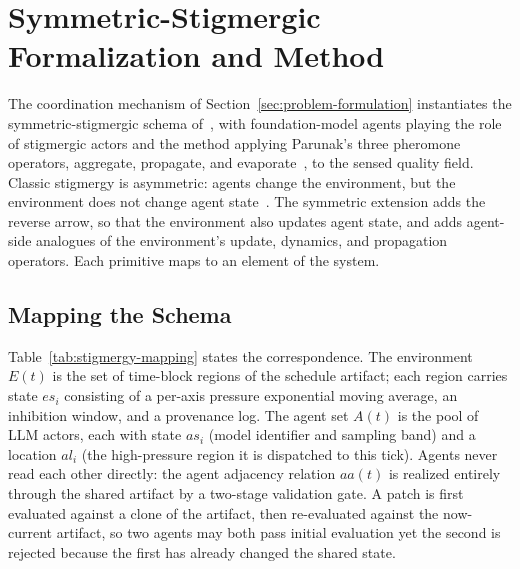 
\section{Symmetric-Stigmergic Formalization and Method}
\label{sec:symmetric-stigmergy}

The coordination mechanism of Section~\ref{sec:problem-formulation} instantiates the symmetric-stigmergic schema of~\cite{parunak2025insects}, with foundation-model agents playing the role of stigmergic actors and the method applying Parunak's three pheromone operators, aggregate, propagate, and evaporate~\cite{parunak2011mean}, to the sensed quality field. Classic stigmergy is asymmetric: agents change the environment, but the environment does not change agent state~\cite{grasse1959stigmergie,parunak1997ant}. The symmetric extension adds the reverse arrow, so that the environment also updates agent state, and adds agent-side analogues of the environment's update, dynamics, and propagation operators. Each primitive maps to an element of the system.

\subsection{Mapping the Schema}

Table~\ref{tab:stigmergy-mapping} states the correspondence. The environment $E(t)$ is the set of time-block regions of the schedule artifact; each region carries state $es_i$ consisting of a per-axis pressure exponential moving average, an inhibition window, and a provenance log. The agent set $A(t)$ is the pool of LLM actors, each with state $as_i$ (model identifier and sampling band) and a location $al_i$ (the high-pressure region it is dispatched to this tick). Agents never read each other directly: the agent adjacency relation $aa(t)$ is realized entirely through the shared artifact by a two-stage validation gate. A patch is first evaluated against a clone of the artifact, then re-evaluated against the now-current artifact, so two agents may both pass initial evaluation yet the second is rejected because the first has already changed the shared state.

